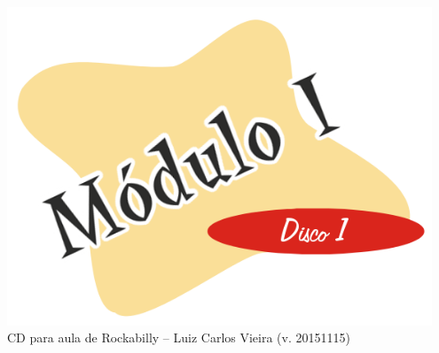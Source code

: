 \documentclass{article}
\begin{document}
\begin{minipage}[t][0.95\textheight][c]{0.5\textwidth}
    \centering
    \includegraphics[width=0.95\textwidth]{m1d1.png}\\
    {\tiny CD para aula de Rockabilly -- Luiz Carlos Vieira (v. 20151115)}
\end{minipage}

\newpage
\end{document}
